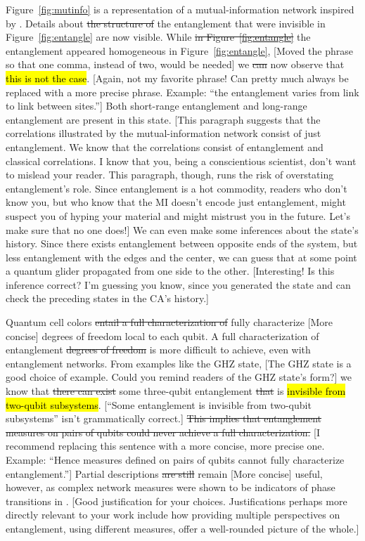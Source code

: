 \documentclass[11pt]{article}
\newcommand{\nicole}[1]{{\color{Green}#1}}
\begin{document}
\begin{multicols}{2}
Figure~\ref{fig:mutinfo} is a representation of a mutual\nicole{-}information network inspired by \cite{Carr}. Details about \sout{the structure of} the entanglement that were invisible in Figure~\ref{fig:entangle} are now visible. While \sout{in Figure~\ref{fig:entangle}} the entanglement appeared homogeneous \nicole{in Figure~\ref{fig:entangle}, [Moved the phrase so that one comma, instead of two, would be needed]} we \sout{can} now observe that \hl{this is not the case}. 
\nicole{[Again, not my favorite phrase! Can pretty much always be replaced with a more precise phrase. Example: ``the entanglement varies from link to link between sites.'']}
Both short-range entanglement and long-range entanglement are present in this state. 
\nicole{[This paragraph suggests that the correlations illustrated by the mutual-information network consist of just entanglement. We know that the correlations consist of entanglement and classical correlations. I know that you, being a conscientious scientist, don't want to mislead your reader. This paragraph, though, runs the risk of overstating entanglement's role. Since entanglement is a hot commodity, readers who don't know you, but who know that the MI doesn't encode just entanglement, might suspect you of hyping your material and might mistrust you in the future. Let's make sure that no one does!]}
We can even make some inferences about the state's history. Since there exists entanglement between opposite ends of the system, but less entanglement with the edges and the center, we can guess that at some point a quantum glider propagated from one side to the other.
\nicole{[Interesting! Is this inference correct? I'm guessing you know, since you generated the state and can check the preceding states in the CA's history.]}

Quantum cell colors \sout{entail a full characterization of} 
\nicole{fully characterize [More concise]}
degrees of freedom local to each qubit. 
A full characterization of entanglement \sout{degrees of freedom} is more difficult to achieve, even with entanglement networks. 
From examples like the GHZ state\nicole{,} 
\nicole{[The GHZ state is a good choice of example. Could you remind readers of the GHZ state's form?]}
we know that \sout{there can exist} \nicole{some} three-qubit entanglement \sout{that} is \hl{invisible from two-qubit subsystems}. 
\nicole{[``Some entanglement is invisible from two-qubit subsystems'' isn't grammatically correct.]}
\sout{This implies that entanglement measures on pairs of qubits could never achieve a full characterization.} 
\nicole{[I recommend replacing this sentence with a more concise, more precise one. Example:
``Hence measures defined on pairs of qubits cannot fully characterize entanglement.'']}
Partial descriptions \sout{are still} \nicole{remain [More concise]} useful, however, as complex network measures were shown to be indicators of phase transitions in \cite{Carr}. 
\nicole{[Good justification for your choices. \checkmark Justifications perhaps more directly relevant to your work include how providing multiple perspectives on entanglement, using different measures, offer a well-rounded picture of the whole.]}



\end{multicols}
\end{document}
